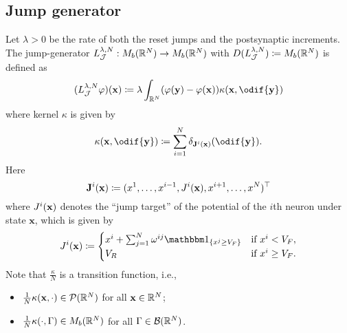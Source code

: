\subsection{Jump generator}
Let \(\lambda > 0\) be the rate of both the reset jumps and the postsynaptic increments.
The jump-generator \(L_{\mathcal{J}}^{\lambda, N} : M_b(\mathbb{R}^N) \to M_b(\mathbb{R}^N)\) with \( D( L_{\mathcal{J}}^{\lambda, N} ) \coloneqq M_b(\mathbb{R}^N) \) is defined as
\begin{equation}
  (L_{\cJ}^{\lambda, N}\varphi) (\bm{x}) \coloneqq \lambda \int_{\potspace^N} \br{\varphi(\bm{y}) - \varphi(\bm{x})} \kappa(\bm{x}, \odif{\bm{y}})
\end{equation}
where kernel \( \kappa \) is given by
\begin{equation}
  \kappa(\bm{x},\odif{\bm{y}}) \coloneqq \sum_{i=1}^N \delta_{\bm{\jtarg}^i(\bm{x})}(\odif{\bm{y}}).
\end{equation}
Here
\begin{equation}
  \mathbf{J}^i(\mathbf{x}) \coloneqq (x^1,\dots,x^{i-1},J^i(\mathbf{x}),x^{i+1},\dots,x^N)^\top
\end{equation}
where \(J^i(\mathbf{x})\) denotes the \enquote{jump target} of the potential of the \(i\)th neuron under state \(\bm{x}\), which is given by
\begin{equation}
  \jtarg^i(\bm{x})
  \coloneqq \begin{cases}
    x^i + \sum_{j=1}^N \omega^{ij} \ind{x^j \geq V_F} & \text{if } x^i < V_F,    \\
    V_R                                               & \text{if } x^i \geq V_F.
  \end{cases}
\end{equation}
Note that \(\frac{\kappa}{N}\) is a transition function, i.e.,
\begin{itemize}
  \item \(\frac{1}{N} \kappa(\mathbf{x},\cdot) \in \mathcal{P}(\mathbb{R}^N)\) for all \(\mathbf{x} \in \mathbb{R}^N\);
  \item \(\frac{1}{N} \kappa(\cdot, \Gamma) \in M_b(\mathbb{R}^N)\) for all \(\Gamma \in \mathcal{B}(\mathbb{R}^N)\).
\end{itemize}

\smallskip

